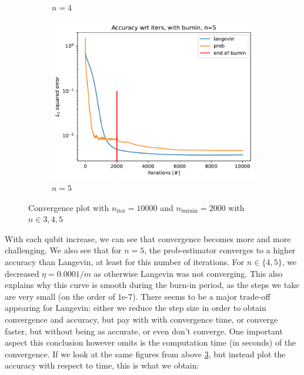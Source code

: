 \documentclass[12pt]{memoir}
\newcommand{\nitern}[1]{$n_{\text{iter}}=#1$}
\newcommand{\nburninn}[1]{$n_{\text{burnin}}=#1$}
\begin{document}
\begin{figure}[H]
\begin{subfigure}[b]{0.49\textwidth}
        \caption{$n=4$}
        \label{fig:conv-plot-diff-n-4-sub}
    \end{subfigure}
    \begin{subfigure}[b]{0.49\textwidth}
        \centering
        \includegraphics[width=\textwidth]{figures/experiments/baseline/diff_n_qubits/iters_acc_comp_iters_no_avg_n5-1.png}
        \caption{$n=5$}
        \label{fig:conv-plot-diff-n-5-sub}
    \end{subfigure}
    \caption{Convergence plot with \nitern{10000} and \nburninn{2000} with $n\in{3,4,5}$}
    \label{fig:conv-plot-diff-n}
\end{figure}

With each qubit increase, we can see that convergence becomes more and more challenging. We also see that for $n=5$, the prob-estimator converges to a higher accuracy than Langevin, at least for this number of iterations. For $n\in\{4,5\}$, we decreased $\eta=0.0001/m$ as otherwise Langevin was not converging. This also explains why this curve is smooth during the burn-in period, as the steps we take are very small (on the order of $1\text{e-}7$). There seems to be a major trade-off appearing for Langevin: either we reduce the step size in order to obtain convergence and accuracy, but pay with with convergence time, or converge faster, but without being as accurate, or even don't converge. One important aspect this conclusion however omits is the computation time (in seconds) of the convergence. If we look at the same figures from above \ref{fig:conv-plot-diff-n}, but instead plot the accuracy with respect to time, this is what we obtain:
\end{document}
